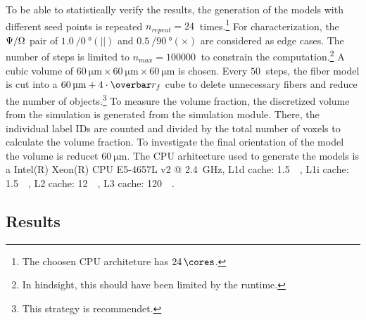 %
To be able to statistically verify the results, the generation of the models with different seed points is repeated $n_{\mathit{repeat}} = \SI{24}{}$ times.\footnote{The choosen \ac{CPU} architeture has $\SI{24}{\cores}$.}
For characterization, the $\textnormal{$\Psi$}/\textnormal{$\Omega$}$ pair of $\SI{1.0}{}/\SI{0}{\degree}(||)$ and $\SI{0.5}{}/\SI{90}{\degree}(\times)$ are considered as edge cases.
The number of steps is limited to $n_{\mathit{max}}=\SI{100000}{}$ to constrain the computation.\footnote{In hindsight, this should have been limited by the runtime.}
A cubic volume of $\SI{60}{\micro\meter} \times \SI{60}{\micro\meter} \times \SI{60}{\micro\meter}$ is chosen.
Every $\SI{50}{}$ steps, the fiber model is cut into a $\SI{60}{\micro\meter}+4 \cdot \fiberRadiusMean$ cube to delete unnecessary fibers and reduce the number of objects.\footnote{This strategy is recommendet.}
To measure the volume fraction, the discretized volume from the simulation is generated from the simulation module.
There, the individual label IDs are counted and divided by the total number of voxels to calculate the volume fraction.
To investigate the final orientation of the model the volume is reducet $\SI{60}{\micro\meter}$.
The \ac{CPU} arhitecture used to generate the models is a
Intel(R) Xeon(R) CPU E5-4657L v2 @ \SI{2.4}{\giga\hertz}, L1d cache: \SI{1.5}{\mega\byte}, L1i cache: \SI{1.5}{\mega\byte}, L2 cache: \SI{12}{\mega\byte}, L3 cache: \SI{120}{\mega\byte}.
%
%
%
\subsection{Results} \label{sec:solverParameterResults}
%
